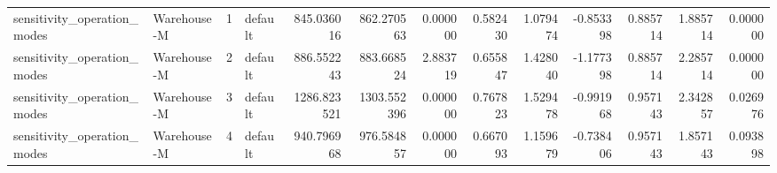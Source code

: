 \begin{tabular}{llrlrrrrrrrrr}
sensitivity\_operation\_modes & Warehouse-M & 1 & default & 845.036016 & 862.270563 & 0.000000 & 0.582430 & 1.079474 & -0.853398 & 0.885714 & 1.885714 & 0.000000 \\
sensitivity\_operation\_modes & Warehouse-M & 2 & default & 886.552243 & 883.668524 & 2.883719 & 0.655847 & 1.428040 & -1.177398 & 0.885714 & 2.285714 & 0.000000 \\
sensitivity\_operation\_modes & Warehouse-M & 3 & default & 1286.823521 & 1303.552396 & 0.000000 & 0.767823 & 1.529478 & -0.991968 & 0.957143 & 2.342857 & 0.026976 \\
sensitivity\_operation\_modes & Warehouse-M & 4 & default & 940.796968 & 976.584857 & 0.000000 & 0.667093 & 1.159679 & -0.738406 & 0.957143 & 1.857143 & 0.093898 \\
\bottomrule
\end{tabular}

